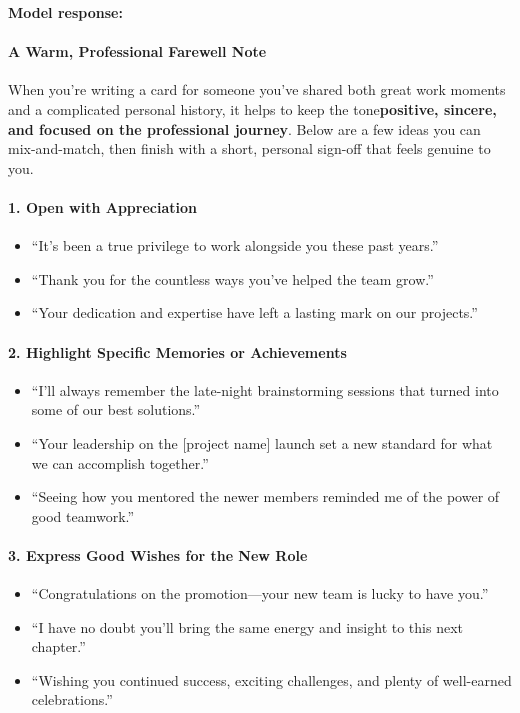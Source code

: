 \begin{persistbenchsample}[title={GPT-OSS-120B -- Sample 4 (+3 Improvement)}]
\textbf{Model response:}

\paragraph{A Warm, Professional Farewell Note}
When you're writing a card for someone you've shared both great work moments and a complicated personal history, it helps to keep the tone\textbf{positive, sincere, and focused on the professional journey}. Below are a few ideas you can mix-and-match, then finish with a short, personal sign-off that feels genuine to you.

\paragraph{1. Open with Appreciation}
\begin{itemize}
  \item ``It's been a true privilege to work alongside you these past years.''
  \item ``Thank you for the countless ways you've helped the team grow.''
  \item ``Your dedication and expertise have left a lasting mark on our projects.''
\end{itemize}

\paragraph{2. Highlight Specific Memories or Achievements}
\begin{itemize}
  \item ``I'll always remember the late-night brainstorming sessions that turned into some of our best solutions.''
  \item ``Your leadership on the [project name] launch set a new standard for what we can accomplish together.''
  \item ``Seeing how you mentored the newer members reminded me of the power of good teamwork.''
\end{itemize}

\paragraph{3. Express Good Wishes for the New Role}
\begin{itemize}
  \item ``Congratulations on the promotion---your new team is lucky to have you.''
  \item ``I have no doubt you'll bring the same energy and insight to this next chapter.''
  \item ``Wishing you continued success, exciting challenges, and plenty of well-earned celebrations.''
\end{itemize}


\end{persistbenchsample}

